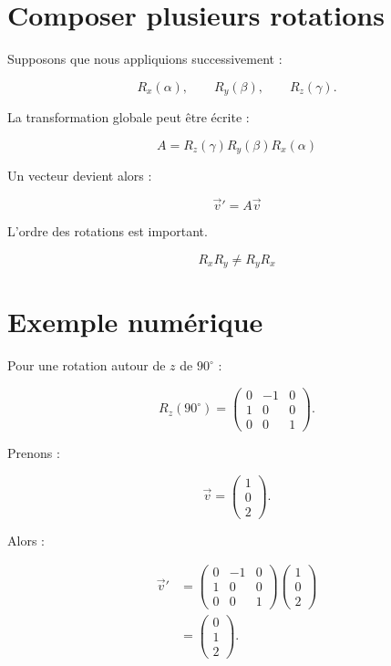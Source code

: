 \documentclass[11pt,a4paper]{article}
\newcommand{\sectiontitle}[1]{\section{#1}}
\begin{document}

\sectiontitle{Composer plusieurs rotations}

Supposons que nous appliquions successivement :

\[
R_x(\alpha),
\qquad
R_y(\beta),
\qquad
R_z(\gamma).
\]

La transformation globale peut être écrite :

\[
\boxed{
A=R_z(\gamma)R_y(\beta)R_x(\alpha)
}
\]

Un vecteur devient alors :

\[
\boxed{\vec v'=A\vec v}
\]

\begin{importantbox}
L'ordre des rotations est important.

\[
\boxed{R_xR_y\neq R_yR_x}
\]
\end{importantbox}


\sectiontitle{Exemple numérique}

Pour une rotation autour de $z$ de $90^\circ$ :

\[
R_z(90^\circ)=
\begin{pmatrix}
0&-1&0\\
1&0&0\\
0&0&1
\end{pmatrix}.
\]

Prenons :

\[
\vec v=
\begin{pmatrix}
1\\
0\\
2
\end{pmatrix}.
\]

Alors :

\[
\begin{aligned}
\vec v'
&=
\begin{pmatrix}
0&-1&0\\
1&0&0\\
0&0&1
\end{pmatrix}
\begin{pmatrix}
1\\
0\\
2
\end{pmatrix}\\[0.3cm]
&=
\begin{pmatrix}
0\\
1\\
2
\end{pmatrix}.
\end{aligned}
\]
\end{document}
